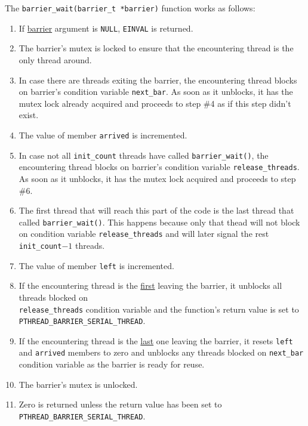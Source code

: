\documentclass{article}
\def\code#1{\texttt{#1}}
\begin{document}
\hspace{-0.6cm} The \code{barrier\_wait(barrier\_t *barrier)} function works as follows:
\begin{enumerate}
 \item If \underline{barrier} argument is \code{NULL}, \code{EINVAL} is returned.
 \item The barrier's mutex is locked to ensure that the encountering thread is the only thread around.
 \item In case there are threads exiting the barrier, the encountering thread blocks on barrier's
       condition variable \code{next\_bar}. As soon as it unblocks, it has the mutex lock already
       acquired and proceeds to step \#4 as if this step didn't exist.
 \item The value of member \code{arrived} is incremented.
 \item In case not all \code{init\_count} threads have called \code{barrier\_wait()}, the
       encountering thread blocks on barrier's condition variable \code{release\_threads}.
       As soon as it unblocks, it has the mutex lock acquired and proceeds to step \#6.
 \item The first thread that will reach this part of the code is the last thread that
       called \code{barrier\_wait()}. This happens because only that thead will not block
       on condition variable \code{release\_threads} and will later signal the rest
       \code{init\_count}$-1$ threads.
 \item The value of member \code{left} is incremented.
 \item If the encountering thread is the \underline{first} leaving the barrier, it unblocks all
       threads blocked on \\ \code{release\_threads} condition variable and the function's
       return value is set to\\ \code{PTHREAD\_BARRIER\_SERIAL\_THREAD}.
 \item If the encountering thread is the \underline{last} one leaving the barrier, it resets
       \code{left} and \code{arrived} members to zero and unblocks any threads blocked on
       \code{next\_bar} condition variable as the barrier is ready for reuse.
 \item The barrier's mutex is unlocked.
 \item Zero is returned unless the return value has been set to \code{PTHREAD\_BARRIER\_SERIAL\_THREAD}.
\end{enumerate}
\end{document}
